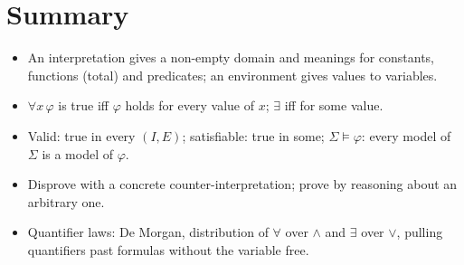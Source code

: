 \section*{Summary}
\begin{itemize}
  \item An interpretation gives a non-empty domain and meanings for constants, functions
        (total) and predicates; an environment gives values to variables.
  \item $\forall x\,\varphi$ is true iff $\varphi$ holds for every value of $x$; $\exists$
        iff for some value.
  \item Valid: true in every $(I,E)$; satisfiable: true in some; $\Sigma\models\varphi$:
        every model of $\Sigma$ is a model of $\varphi$.
  \item Disprove with a concrete counter-interpretation; prove by reasoning about an
        arbitrary one.
  \item Quantifier laws: De Morgan, distribution of $\forall$ over $\land$ and $\exists$
        over $\lor$, pulling quantifiers past formulas without the variable free.
\end{itemize}
